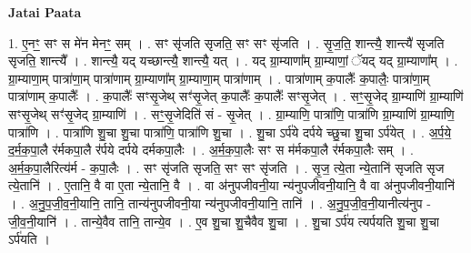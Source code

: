 \documentclass[17pt]{extarticle}
\begin{document}
\textbf{Jatai Paata} \newline

1. ए॒नꣳ॒॒ सꣳ स मे॑न मेनꣳ॒॒ सम् । . सꣳ सृ॑जति सृजति॒ सꣳ सꣳ सृ॑जति । . सृ॒ज॒ति॒ शान्त्यै॒ शान्त्यै॑ सृजति सृजति॒ शान्त्यै᳚ । . शान्त्यै॒ यद् यच्छान्त्यै॒ शान्त्यै॒ यत् । . यद् ग्रा॒म्याणा᳚म् ग्रा॒म्याणां॒ ॅयद् यद् ग्रा॒म्याणा᳚म् । . ग्रा॒म्याणा॒म् पात्रा॑णा॒म् पात्रा॑णाम् ग्रा॒म्याणा᳚म् ग्रा॒म्याणा॒म् पात्रा॑णाम् । . पात्रा॑णाम् क॒पालैः᳚ क॒पालैः॒ पात्रा॑णा॒म् पात्रा॑णाम् क॒पालैः᳚ । . क॒पालैः᳚ सꣳसृ॒जेथ् सꣳ॑सृ॒जेत् क॒पालैः᳚ क॒पालैः᳚ सꣳसृ॒जेत् । . सꣳ॒॒सृ॒जेद् ग्रा॒म्याणि॑ ग्रा॒म्याणि॑ सꣳसृ॒जेथ् सꣳ॑सृ॒जेद् ग्रा॒म्याणि॑ । . सꣳ॒॒सृ॒जेदिति॑ सं - सृ॒जेत् । . ग्रा॒म्याणि॒ पात्रा॑णि॒ पात्रा॑णि ग्रा॒म्याणि॑ ग्रा॒म्याणि॒ पात्रा॑णि । . पात्रा॑णि शु॒चा शु॒चा पात्रा॑णि॒ पात्रा॑णि शु॒चा । . शु॒चा ऽर्प॑ये दर्पये च्छु॒चा शु॒चा ऽर्प॑येत् । . अ॒र्प॒ये॒ द॒र्म॒क॒पा॒लै र॑र्मकपा॒लै र॑र्पये दर्पये दर्मकपा॒लैः । . अ॒र्म॒क॒पा॒लैः सꣳ स म॑र्मकपा॒लै र॑र्मकपा॒लैः सम् । . अ॒र्म॒क॒पा॒लैरित्य॑र्म - क॒पा॒लैः । . सꣳ सृ॑जति सृजति॒ सꣳ सꣳ सृ॑जति । . सृ॒ज॒ त्ये॒ता न्ये॒तानि॑ सृजति सृज त्ये॒तानि॑ । . ए॒तानि॒ वै वा ए॒ता न्ये॒तानि॒ वै । . वा अ॑नुपजीवनी॒या न्य॑नुपजीवनी॒यानि॒ वै वा अ॑नुपजीवनी॒यानि॑ । . अ॒नु॒प॒जी॒व॒नी॒यानि॒ तानि॒ तान्य॑नुपजीवनी॒या न्य॑नुपजीवनी॒यानि॒ तानि॑ । . अ॒नु॒प॒जी॒व॒नी॒यानीत्य॑नुप - जी॒व॒नी॒यानि॑ । . तान्ये॒वैव तानि॒ तान्ये॒व । . ए॒व शु॒चा शु॒चैवैव शु॒चा । . शु॒चा ऽर्प॑य त्यर्पयति शु॒चा शु॒चा ऽर्प॑यति । \newline
\end{document}
